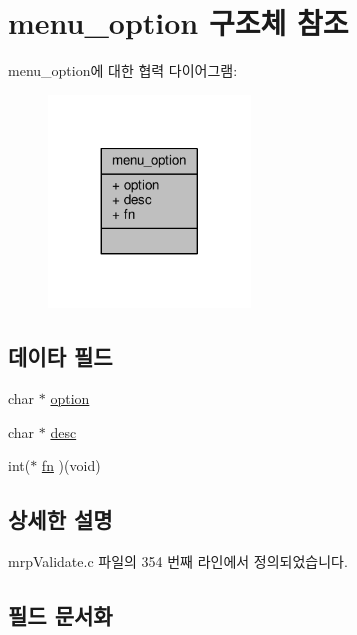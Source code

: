 \hypertarget{structmenu__option}{}\section{menu\+\_\+option 구조체 참조}
\label{structmenu__option}


menu\+\_\+option에 대한 협력 다이어그램\+:
\nopagebreak
\begin{figure}[H]
\begin{center}
\leavevmode
\includegraphics[width=152pt]{structmenu__option__coll__graph}
\end{center}
\end{figure}
\subsection*{데이타 필드}
\begin{DoxyCompactItemize}
\item 
char $\ast$ \hyperlink{structmenu__option_a756aafa2c9b99eaa7eb7f8886c7a8cb2}{option}
\item 
char $\ast$ \hyperlink{structmenu__option_a3aad16fd4bea1b9717f232ea75ad6449}{desc}
\item 
int($\ast$ \hyperlink{structmenu__option_a99dd1ee43f3d0c2b26116fc4528bf21d}{fn} )(void)
\end{DoxyCompactItemize}


\subsection{상세한 설명}


mrp\+Validate.\+c 파일의 354 번째 라인에서 정의되었습니다.



\subsection{필드 문서화}
